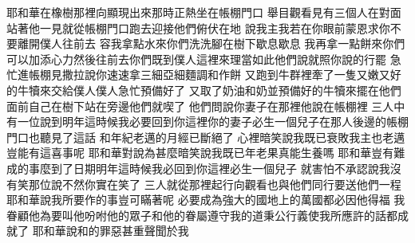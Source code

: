 \bchapter%
耶和華在橡樹那裡\chientien 向顯現出來\yuentien 那時正熱\chientien{}坐在帳棚門口\chuan 
{}舉目觀看\chientien 見有三個人在對面站著\yuentien 他一見\chientien 就從帳棚門口跑去迎接他們\chientien 俯伏在地\chientien 
{}說\chientien 我主\chientien 我若在你眼前蒙恩\chientien 求你不要離開僕人往前去\chuan 
{}容我拿點水來\chientien 你們洗洗腳\chientien 在樹下歇息歇息\yuentien 
{}我再拿一點餅來\chientien 你們可以加添心力\chientien 然後往前去\chientien 你們既到僕人這裡來\chientien 理當如此\chuan 他們說\chientien 就照你說的行罷\chuan 
{}急忙進帳棚見撒拉說\chientien 你速速拿三細亞細麵調和作餅\chuan 
{}又跑到牛群裡\chientien 牽了一隻又嫩又好的牛犢來\chientien 交給僕人\chientien 僕人急忙預備好了\chuan 
{}又取了奶油和奶\chientien 並預備好的牛犢來\chientien 擺在他們面前\chientien 自己在樹下站在旁邊\chientien 他們就喫了\chuan\Chuan
{}他們問說\chientien 你妻子在那裡\chientien 他說\chientien 在帳棚裡\chuan 
{}三人中有一位說\chientien 到明年這時候\chientien 我必要回到你這裡\chientien 你的妻子必生一個兒子\yuentien{}在那人後邊的帳棚門口\chientien 也聽見了這話\chuan 
{}和年紀老邁\chientien{}的月經已斷絕了\chuan 
{}心裡暗笑\chientien 說\chientien 我既已衰敗\chientien 我主也老邁\chientien 豈能有這喜事呢\chuan 
{}耶和華對說\chientien{}為甚麼暗笑\chientien 說\chientien 我既已年老\chientien 果真能生養嗎\chuan 
{}耶和華豈有難成的事麼\yuentien 到了日期\chientien 明年這時候\chientien 我必回到你這裡\chientien{}必生一個兒子\chuan 
{}就害怕\chientien 不承認\chientien 說\chientien 我沒有笑\yuentien 那位說\chientien 不然\chientien 你實在笑了\chuan\Chuan
{}三人就從那裡起行\chientien 向觀看\chientien{}也與他們同行\chientien 要送他們一程\chuan 
{}耶和華說\chientien 我所要作的事\chientien 豈可瞞著呢\yuentien 
{}必要成為強大的國\chientien 地上的萬國都必因他得福\chuan 
{}我眷顧他\chientien 為要叫他吩咐他的眾子\chientien 和他的眷屬\chientien 遵守我的道\chientien 秉公行義\chientien 使我所應許的話都成就了\chuan 
{}耶和華說\chientien{}和的罪惡甚重\chientien 聲聞於我\chuan 

